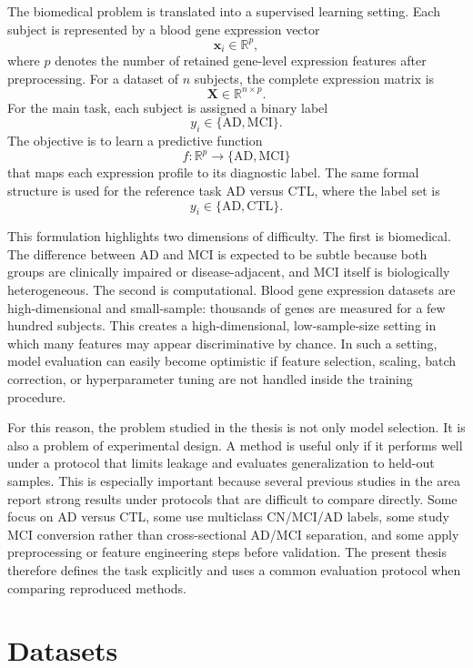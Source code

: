 The biomedical problem is translated into a supervised learning setting. Each subject is represented by a blood gene expression vector
\[
    \mathbf{x}_i \in \mathbb{R}^{p},
\]
where \(p\) denotes the number of retained gene-level expression features after preprocessing. For a dataset of \(n\) subjects, the complete expression matrix is
\[
    \mathbf{X} \in \mathbb{R}^{n \times p}.
\]
For the main task, each subject is assigned a binary label
\[
    y_i \in \{\mathrm{AD}, \mathrm{MCI}\}.
\]
The objective is to learn a predictive function
\[
    f: \mathbb{R}^{p} \rightarrow \{\mathrm{AD}, \mathrm{MCI}\}
\]
that maps each expression profile to its diagnostic label. The same formal structure is used for the reference task AD versus CTL, where the label set is
\[
    y_i \in \{\mathrm{AD}, \mathrm{CTL}\}.
\]

This formulation highlights two dimensions of difficulty. The first is biomedical. The difference between AD and MCI is expected to be subtle because both groups are clinically impaired or disease-adjacent, and MCI itself is biologically heterogeneous. The second is computational. Blood gene expression datasets are high-dimensional and small-sample: thousands of genes are measured for a few hundred subjects. This creates a high-dimensional, low-sample-size setting in which many features may appear discriminative by chance. In such a setting, model evaluation can easily become optimistic if feature selection, scaling, batch correction, or hyperparameter tuning are not handled inside the training procedure.

For this reason, the problem studied in the thesis is not only model selection. It is also a problem of experimental design. A method is useful only if it performs well under a protocol that limits leakage and evaluates generalization to held-out samples. This is especially important because several previous studies in the area report strong results under protocols that are difficult to compare directly. Some focus on AD versus CTL, some use multiclass CN/MCI/AD labels, some study MCI conversion rather than cross-sectional AD/MCI separation, and some apply preprocessing or feature engineering steps before validation. The present thesis therefore defines the task explicitly and uses a common evaluation protocol when comparing reproduced methods.

\section{Datasets}
\label{sec:datasets}

